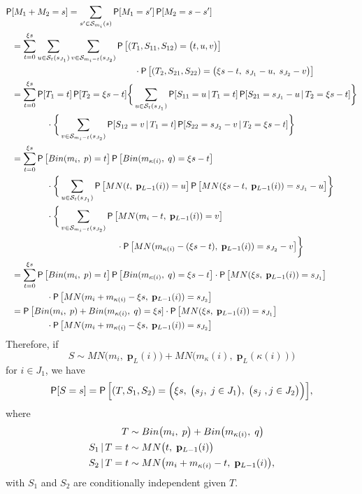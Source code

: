 \documentclass[11pt,draft]{article}
\newcommand{\Ssp}{\mathcal{S}}
\newcommand{\pv}{\mathbf{p}}
\begin{document}
\begin{align*}
\P&[M_1 + M_2 = s] = \sum_{s' \in \Ssp_{m_i}(s)} \P[M_1 = s']\P[M_2 = s - s'] \\
&= \sum_{t = 0}^{\xi s} \sum_{u \in \Ssp_t(s_{J_1})}
\sum_{v \in \Ssp_{m_i - t}(s_{J_2})}
\P\big[(T_1, S_{11}, S_{12}) = \big(t, u, v\big)\big] \\
&\hspace{14em} \cdot
\P\big[(T_2, S_{21}, S_{22}) = \big(\xi s - t,\; s_{J_1} - u,\;
s_{J_2} - v\big)\big] \\
&= \sum_{t = 0}^{\xi s} \P[T_1 = t] \P[T_2 = \xi s - t]
\bigg\{ \sum_{u \in \Ssp_t(s_{J_1})} \P[S_{11} = u \given T_1 = t]
\P[S_{21} = s_{J_1} - u \given T_2 = \xi s - t] \bigg\} \\
&\hspace{4em}\cdot \bigg\{ \sum_{v \in \Ssp_{m_i - t}(s_{J_2})}
\P[S_{12} = v \given T_1 = t]
\P[S_{22} = s_{J_2} - v \given T_2 = \xi s - t] \bigg\} \\
&= \sum_{t = 0}^{\xi s} \P\big[Bin(m_i,\; p) = t\big]
\P\big[Bin(m_{\kappa(i)},\; q) = \xi s - t\big] \\
&\hspace{4em}\cdot
\bigg\{ \sum_{u \in \Ssp_t(s_{J_1})}
\P\big[MN(t,\; \pv_{L-1}(i)) = u \big]
\P\big[MN(\xi s - t,\; \pv_{L-1}(i)) = s_{J_1} - u \big] \bigg\} \\
&\hspace{4em}\cdot \bigg\{ \sum_{v \in \Ssp_{m_i - t}(s_{J_2})}
\P\big[MN(m_i - t,\; \pv_{L-1}(i)) = v \big] \\
&\hspace{12em}\cdot
\P\big[MN(m_{\kappa(i)} - (\xi s - t),\;
\pv_{L-1}(i)) = s_{J_2} - v \big] \bigg\} \\
&= \sum_{t = 0}^{\xi s} \P\big[Bin(m_i,\; p) = t\big]
\P\big[Bin(m_{\kappa(i)},\; q) = \xi s - t\big]
\cdot \P\big[MN(\xi s,\; \pv_{L-1}(i)) = s_{J_1} \big] \\
&\hspace{4em}\cdot
\P\big[MN(m_i + m_{\kappa(i)} - \xi s,\; \pv_{L-1}(i)) = s_{J_2} \big] \\
&= \P\big[Bin(m_i,\; p) + Bin(m_{\kappa(i)},\; q) = \xi s]
\cdot \P\big[MN(\xi s,\; \pv_{L-1}(i)) = s_{J_1} \big] \\
&\hspace{4em}\cdot
\P\big[MN(m_i + m_{\kappa(i)} - \xi s,\; \pv_{L-1}(i)) = s_{J_2} \big]
\end{align*}
Therefore, if
\[ S \sim MN\big(m_i,\; \pv_L(i)\big) +
MN\big(m_\kappa(i),\; \pv_L(\kappa(i))\big) \]
for $i \in J_1$, we have
\[ \P[S = s] = \P\Big[(T, S_1, S_2) = \Big(\xi s,\;
\big(s_j,\; j\in J_1\big),\; \big(s_j\;, j\in J_2\big)\Big)\Big], \]
where
\begin{align}
T &\sim Bin\big(m_i,\; p\big) + Bin\big(m_{\kappa(i)},\; q\big)\nonumber\\
S_1 \given T = t &\sim MN\big(t,\; \pv_{L-1}(i)\big) \nonumber\\
S_2 \given T = t &\sim MN\big(m_i + m_{\kappa(i)} - t,\; \pv_{L-1}(i)\big),
\nonumber
\end{align}
with $S_1$ and $S_2$ are conditionally independent given $T$.
\end{document}
